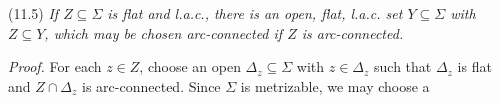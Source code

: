 \stmt
(11.5) \textit{If $Z \subseteq \Sigma$ is flat and l.a.c., there is an open, flat, l.a.c. set $Y \subseteq \Sigma$ with $Z \subseteq Y$, which may be chosen arc-connected if $Z$ is arc-connected.}

\textit{Proof.} For each $z \in Z$, choose an open $\Delta_z \subseteq \Sigma$ with $z \in \Delta_z$ such that $\Delta_z$ is flat and $Z \cap \Delta_z$ is arc-connected. Since $\Sigma$ is metrizable, we may choose a
